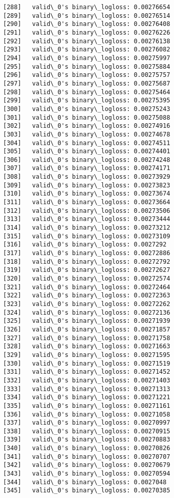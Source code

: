 \documentclass[11pt]{article}
\begin{document}
\begin{Verbatim}[commandchars=\\\{\}]
[288]	valid\_0's binary\_logloss: 0.00276654
[289]	valid\_0's binary\_logloss: 0.00276514
[290]	valid\_0's binary\_logloss: 0.00276408
[291]	valid\_0's binary\_logloss: 0.00276226
[292]	valid\_0's binary\_logloss: 0.00276138
[293]	valid\_0's binary\_logloss: 0.00276082
[294]	valid\_0's binary\_logloss: 0.00275997
[295]	valid\_0's binary\_logloss: 0.00275884
[296]	valid\_0's binary\_logloss: 0.00275757
[297]	valid\_0's binary\_logloss: 0.00275687
[298]	valid\_0's binary\_logloss: 0.00275464
[299]	valid\_0's binary\_logloss: 0.00275395
[300]	valid\_0's binary\_logloss: 0.00275243
[301]	valid\_0's binary\_logloss: 0.00275088
[302]	valid\_0's binary\_logloss: 0.00274916
[303]	valid\_0's binary\_logloss: 0.00274678
[304]	valid\_0's binary\_logloss: 0.00274511
[305]	valid\_0's binary\_logloss: 0.00274401
[306]	valid\_0's binary\_logloss: 0.00274248
[307]	valid\_0's binary\_logloss: 0.00274171
[308]	valid\_0's binary\_logloss: 0.00273929
[309]	valid\_0's binary\_logloss: 0.00273823
[310]	valid\_0's binary\_logloss: 0.00273674
[311]	valid\_0's binary\_logloss: 0.00273664
[312]	valid\_0's binary\_logloss: 0.00273506
[313]	valid\_0's binary\_logloss: 0.00273444
[314]	valid\_0's binary\_logloss: 0.00273212
[315]	valid\_0's binary\_logloss: 0.00273109
[316]	valid\_0's binary\_logloss: 0.0027292
[317]	valid\_0's binary\_logloss: 0.00272886
[318]	valid\_0's binary\_logloss: 0.00272792
[319]	valid\_0's binary\_logloss: 0.00272627
[320]	valid\_0's binary\_logloss: 0.00272574
[321]	valid\_0's binary\_logloss: 0.00272464
[322]	valid\_0's binary\_logloss: 0.00272363
[323]	valid\_0's binary\_logloss: 0.00272262
[324]	valid\_0's binary\_logloss: 0.00272136
[325]	valid\_0's binary\_logloss: 0.00271939
[326]	valid\_0's binary\_logloss: 0.00271857
[327]	valid\_0's binary\_logloss: 0.00271758
[328]	valid\_0's binary\_logloss: 0.00271663
[329]	valid\_0's binary\_logloss: 0.00271595
[330]	valid\_0's binary\_logloss: 0.00271519
[331]	valid\_0's binary\_logloss: 0.00271452
[332]	valid\_0's binary\_logloss: 0.00271403
[333]	valid\_0's binary\_logloss: 0.00271313
[334]	valid\_0's binary\_logloss: 0.00271221
[335]	valid\_0's binary\_logloss: 0.00271161
[336]	valid\_0's binary\_logloss: 0.00271058
[337]	valid\_0's binary\_logloss: 0.00270997
[338]	valid\_0's binary\_logloss: 0.00270915
[339]	valid\_0's binary\_logloss: 0.00270883
[340]	valid\_0's binary\_logloss: 0.00270826
[341]	valid\_0's binary\_logloss: 0.00270707
[342]	valid\_0's binary\_logloss: 0.00270679
[343]	valid\_0's binary\_logloss: 0.00270594
[344]	valid\_0's binary\_logloss: 0.0027048
[345]	valid\_0's binary\_logloss: 0.00270385

\end{Verbatim}
\end{document}
